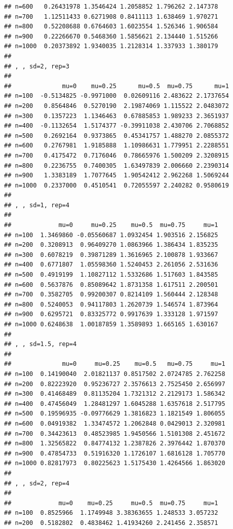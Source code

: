 \documentclass[11pt,a4paper]{article}
\begin{document}
\begin{verbatim}
## n=600   0.26431978 1.3546424 1.2058852 1.796262 2.147378
## n=700   1.12511433 0.6271908 0.8411113 1.638469 1.970271
## n=800   0.52208688 0.6764603 1.6023554 1.526346 1.906584
## n=900   0.22266670 0.5468360 1.5856621 2.134440 1.515266
## n=1000  0.20373892 1.9340035 1.2128314 1.337933 1.380179
## 
## , , sd=2, rep=3
## 
##              mu=0    mu=0.25      mu=0.5  mu=0.75      mu=1
## n=100  -0.5134825 -0.9971000  0.02609116 2.483622 2.1737654
## n=200   0.8564846  0.5270190  2.19874069 1.115522 2.0483072
## n=300   0.1357223  1.1346463  0.67885853 1.989233 2.3651937
## n=400  -0.1132654  1.5174377 -0.39911038 2.430706 2.7068852
## n=500   0.2692164  0.9373865  0.45341757 1.488270 2.0855372
## n=600   0.2767981  1.9185888  1.10986631 1.779951 2.2288551
## n=700   0.4175472  0.7176046  0.78665976 1.500209 2.3208915
## n=800   0.2236755  0.7400305  1.63497839 2.006660 2.2390314
## n=900   1.3383189  1.7077645  1.90542412 2.962268 1.5069244
## n=1000  0.2337000  0.4510541  0.72055597 2.240282 0.9580619
## 
## , , sd=1, rep=4
## 
##             mu=0     mu=0.25    mu=0.5  mu=0.75     mu=1
## n=100  1.3469860 -0.05560687 1.0932454 1.903516 2.156825
## n=200  0.3208913  0.96409270 1.0863966 1.386434 1.835235
## n=300  0.6078219  0.39871289 1.3616965 2.100878 1.933667
## n=400  0.6771807  1.05598360 1.5240453 2.261056 2.531636
## n=500  0.4919199  1.10827112 1.5332686 1.517603 1.843585
## n=600  0.5637876  0.85089642 1.8731358 1.617511 2.200501
## n=700  0.3582705  0.99200307 0.8214109 1.560444 2.128348
## n=800  0.5240053  0.94117803 1.2620739 1.546574 1.873964
## n=900  0.6295721  0.83325772 0.9917639 1.333128 1.971597
## n=1000 0.6248638  1.00187859 1.3589893 1.665165 1.630167
## 
## , , sd=1.5, rep=4
## 
##              mu=0     mu=0.25    mu=0.5   mu=0.75     mu=1
## n=100  0.14190040  2.01821137 0.8517502 2.0724785 2.762258
## n=200  0.82223920  0.95236727 2.3576613 2.7525450 2.656997
## n=300  0.41468489  0.81135204 1.7321312 2.2129173 1.586342
## n=400  0.47456049  1.28481297 1.6045288 1.6357618 2.517795
## n=500  0.19596935 -0.09776629 1.3816823 1.1821549 1.806055
## n=600  0.04919382  1.33474572 1.2062848 0.0429013 2.320981
## n=700  0.34423613  0.48523985 1.9450566 1.5101308 2.451672
## n=800  1.32565822  0.84774132 1.2387826 2.3976442 1.870370
## n=900  0.47854733  0.51916320 1.1726107 1.6816128 1.705770
## n=1000 0.82817973  0.80225623 1.5175430 1.4264566 1.863020
## 
## , , sd=2, rep=4
## 
##             mu=0    mu=0.25     mu=0.5  mu=0.75     mu=1
## n=100  0.8525966  1.1749948 3.38363655 1.248533 3.057232
## n=200  0.5182802  0.4838462 1.41934260 2.241456 2.358571

\end{verbatim}
\end{document}
